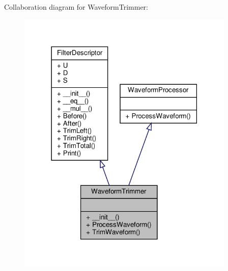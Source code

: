Collaboration diagram for Waveform\+Trimmer\+:
\nopagebreak
\begin{figure}[H]
\begin{center}
\leavevmode
\includegraphics[width=294pt]{classSignalIntegrity_1_1TimeDomain_1_1Filters_1_1WaveformTrimmer_1_1WaveformTrimmer__coll__graph}
\end{center}
\end{figure}
